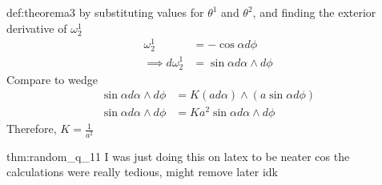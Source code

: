 \documentclass[landscape, 8pt]{extarticle}
\begin{document}
\begin{multicols}{3}
\begin{xmp}{def:theorema}{3}
    by substituting values for \(\theta^{1}\) and \(\theta^{2}\), and finding the exterior derivative of \(\omega^{1}_{2}\)
    \begin{align*}
        \omega^{1}_{2} &= -\cos\alpha d\phi \\
        \implies d\omega^{1}_{2} &= \sin\alpha d\alpha\wedge d\phi
    \end{align*}
    Compare to wedge
    \begin{align*}
        \sin\alpha d\alpha\wedge d\phi &= K (ad\alpha) \wedge (a\sin\alpha d\phi) \\
        \sin\alpha d\alpha\wedge d\phi&= K a^{2}\sin\alpha d\alpha\wedge d\phi
    \end{align*}
    Therefore, \(\displaystyle K = \frac{1}{a^{2}}\)
\end{xmp}


\begin{thm}[random q]{thm:random_q_1}{1}
    I was just doing this on latex to be neater cos the calculations were really tedious, might remove later idk


\end{thm}
\end{multicols}
\end{document}
